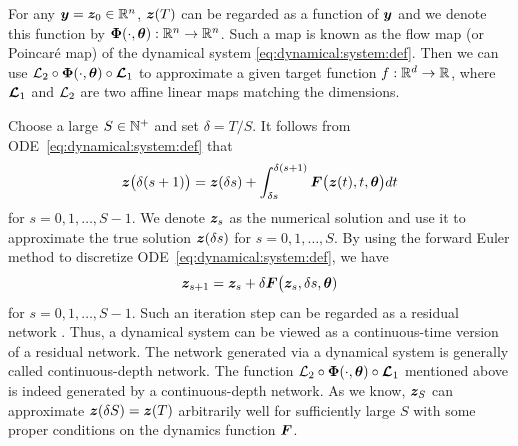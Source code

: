 \documentclass[nohyperref]{article}
\theoremstyle{plain}
\theoremstyle{definition}
\theoremstyle{remark}
\begin{document}
For any $\bmy=\bmz_0\in\R^n$, ${\bm{z}}(T)$ can be regarded as a function of ${\bm{y}}$ and we denote this function by $\bmPhi(\cdot,\bmtheta):\R^n\to\R^n$.
Such a map is known as the flow map (or Poincar\'e map) of the dynamical system \eqref{eq:dynamical:system:def}. Then we can use ${\mathcal{L}}_2\circ {\bm{\Phi}}(\cdot , {\bm{\theta}})\circ {\bm{\mathcal{L}}}_1$ to approximate a given target function $f:\R^d\to\R$, where ${\bm{\mathcal{L}}}_1$ and ${\mathcal{L}}_2$ are two affine linear maps matching the dimensions. 

Choose a large $S\in\N^+$ and set $\delta=T/S$.
It follows from ODE~\eqref{eq:dynamical:system:def} that
\begin{equation*}
    {\bm{z}}\big(\delta  (s+1)\big)={\bm{z}}(\delta   s) + \int_{ \delta s}^{\delta(s+1)} {\bm{F}}\big({\bm{z}}(t),t,{\bm{\theta}}\big)dt
\end{equation*}
for $s=0,1,\dotsc,S-1$.
We denote ${\bm{z}}_{s}$ as the numerical solution and use it to approximate the true solution ${\bm{z}}(\delta  s)$ for $s=0,1,\dotsc,S$.
By using the forward Euler method to discretize ODE~\eqref{eq:dynamical:system:def}, we have
\begin{equation*}
    {\bm{z}}_{s+1}
    =
{\bm{z}}_s+\delta{\bm{F}}\big({\bm{z}}_s,\delta  s,{\bm{\theta}})
\end{equation*}
for $s=0,1,\dotsc,S-1$. Such an iteration step can be regarded as a residual network \cite{7780459}. Thus, a dynamical system can be viewed as a continuous-time version of a residual network. The network generated via a dynamical system is generally called continuous-depth network. The function ${\mathcal{L}}_2\circ {\bm{\Phi}}(\cdot , {\bm{\theta}})\circ {\bm{\mathcal{L}}}_1$ mentioned above is indeed generated by a continuous-depth network.
As we know, ${\bm{z}}_{S}$ can approximate ${\bm{z}}(\delta  S)={\bm{z}}(T)$ arbitrarily well for sufficiently large $S$ with some proper conditions on the dynamics function ${\bm{F}}$.
\end{document}

